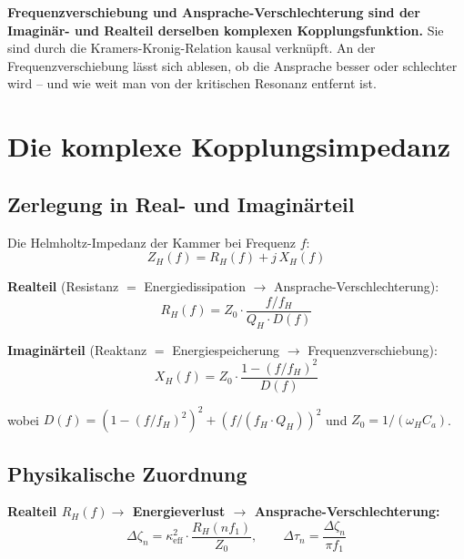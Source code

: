 \documentclass[11pt,a4paper]{article}
\begin{document}
\begin{keybox}
\textbf{Frequenzverschiebung und Ansprache-Verschlechterung sind der Imaginär- und Realteil derselben komplexen Kopplungsfunktion.} Sie sind durch die Kramers-Kronig-Relation kausal verknüpft. An der Frequenzverschiebung lässt sich ablesen, ob die Ansprache besser oder schlechter wird -- und wie weit man von der kritischen Resonanz entfernt ist.
\end{keybox}

\section{Die komplexe Kopplungsimpedanz}

\subsection{Zerlegung in Real- und Imaginärteil}

Die Helmholtz-Impedanz der Kammer bei Frequenz $f$:
\begin{equation}
Z_H(f) = R_H(f) + j\,X_H(f)
\end{equation}

\textbf{Realteil} (Resistanz $=$ Energiedissipation $\to$ Ansprache-Verschlechterung):
\begin{equation}
R_H(f) = Z_0 \cdot \frac{f/f_H}{Q_H \cdot D(f)}
\end{equation}

\textbf{Imaginärteil} (Reaktanz $=$ Energiespeicherung $\to$ Frequenzverschiebung):
\begin{equation}
X_H(f) = Z_0 \cdot \frac{1 - (f/f_H)^2}{D(f)}
\end{equation}

wobei $D(f) = \left(1 - (f/f_H)^2\right)^2 + \left(f/(f_H \cdot Q_H)\right)^2$ und $Z_0 = 1/(\omega_H C_a)$.

\subsection{Physikalische Zuordnung}

\textbf{Realteil $R_H(f) \to$ Energieverlust $\to$ Ansprache-Verschlechterung:}
\begin{equation}
\Delta\zeta_n = \kappa_\text{eff}^2 \cdot \frac{R_H(nf_1)}{Z_0}, \qquad \Delta\tau_n = \frac{\Delta\zeta_n}{\pi f_1}
\end{equation}
\end{document}
